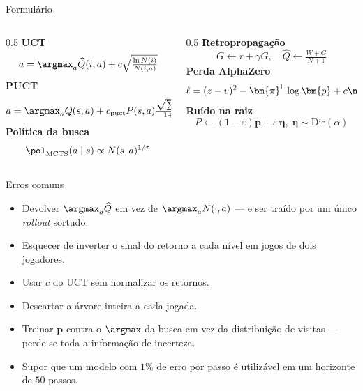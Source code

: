 \documentclass[aspectratio=169, 11pt]{beamer}
\newcommand{\Nv}[1]{N(#1)}                      %
\newcommand{\Qh}{\widehat{Q}}                   %
\newcommand{\ret}{G}                            %
\begin{document}
\begin{frame}{Formulário}
  \begin{columns}[T]
    \begin{column}{0.5\textwidth}
      {\small
      \textbf{UCT}
      \[ a = \argmax_a \Qh(i,a) + c\sqrt{\tfrac{\ln \Nv{i}}{\Nv{i,a}}} \]
      \textbf{PUCT}
      \[ a = \argmax_a Q(s,a) + c_{\text{puct}} P(s,a)\tfrac{\sqrt{\sum_b \Nv{s,b}}}{1+\Nv{s,a}} \]
      \textbf{Política da busca}
      \[ \pol_{\text{MCTS}}(a\mid s) \propto \Nv{s,a}^{1/\tau} \]}
    \end{column}
    \begin{column}{0.5\textwidth}
      {\small
      \textbf{Retropropagação}
      \[ \ret \gets r + \gamma \ret, \quad
         \Qh \gets \tfrac{W + \ret}{N+1} \]
      \textbf{Perda AlphaZero}
      \[ \ell = (z-v)^2 - \bm{\pi}^{\!\top}\log \bm{p} + c\norm{\theta}^2 \]
      \textbf{Ruído na raiz}
      \[ P \gets (1-\varepsilon)\bm{p} + \varepsilon\,\bm{\eta},\;
         \bm{\eta}\sim\mathrm{Dir}(\alpha) \]}
    \end{column}
  \end{columns}
\end{frame}

\begin{frame}{Erros comuns}
  \begin{alertabox}
    \begin{itemize}\setlength{\itemsep}{0.3ex}
      \item Devolver $\argmax_a \Qh$ em vez de $\argmax_a \Nv{\cdot,a}$ --- e
            ser traído por um único \emph{rollout} sortudo.
      \item Esquecer de inverter o sinal do retorno a cada nível em jogos de dois
            jogadores.
      \item Usar $c$ do UCT sem normalizar os retornos.
      \item Descartar a árvore inteira a cada jogada.
      \item Treinar $\bm{p}$ contra o $\argmax$ da busca em vez da distribuição
            de visitas --- perde-se toda a informação de incerteza.
      \item Supor que um modelo com $1\%$ de erro por passo é utilizável em um
            horizonte de $50$ passos.
    \end{itemize}
  \end{alertabox}
\end{frame}
\end{document}
